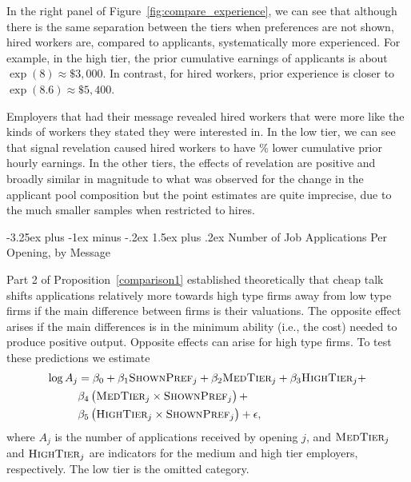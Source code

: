 \documentclass[12pt]{article}
\makeatletter
\renewcommand{\subsection}{%
  \@startsection{subsection}{2}{\z@}%
  {-3.25ex plus -1ex minus -.2ex}%
  {1.5ex plus .2ex}%
  {\normalfont\large\bfseries}%
}
\makeatother
\begin{document}
In the right panel of Figure~\ref{fig:compare_experience}, we can see that although there is the same separation between the tiers when preferences are not shown, hired workers are, compared to applicants, systematically more experienced.
For example, in the high tier, the prior cumulative earnings of applicants is about $\exp(8) \approx \$3,000$.
In contrast, for hired workers, prior experience is closer to $\exp(8.6) \approx \$5,400$.

Employers that had their message revealed hired workers that were more like the kinds of workers they stated they were interested in. 
In the low tier, we can see that signal revelation caused hired workers to have \EffectEarningsExperienceLowTierHiredRegression{}\% lower cumulative prior hourly earnings.
In the other tiers, the effects of revelation are positive and broadly similar in magnitude to what was observed for the change in the applicant pool composition but the point estimates are quite imprecise, due to the much smaller samples when restricted to hires. 

\subsection{Number of Job Applications Per Opening, by Message} %

Part 2 of Proposition~\ref{comparison1} established theoretically that cheap talk shifts applications relatively more towards high type firms away from low type firms if the main difference between firms is their valuations. The opposite effect arises if the main differences is in the minimum ability (i.e., the cost) needed to produce positive output. Opposite effects can arise for high type firms. To test these predictions we estimate
\begin{align} \label{eq:appsi}
  \log A_{j} & = \beta_0 + \beta_1 \textsc{ShownPref}_j + \beta_2 \textsc{MedTier}_j + \beta_3 \textsc{HighTier}_j  + \nonumber\\  
           & \beta_4 \left(\textsc{MedTier}_j \times \textsc{ShownPref}_j \right) + \nonumber \\  
           & \beta_5 \left(\textsc{HighTier}_j \times \textsc{ShownPref}_j\right) + \epsilon,
\end{align}
where $A_j$ is the number of applications received by opening $j$, and $\textsc{MedTier}_j$ and $\textsc{HighTier}_j$ are indicators for the medium and high tier employers, respectively.
The low tier is the omitted category.
\end{document}

